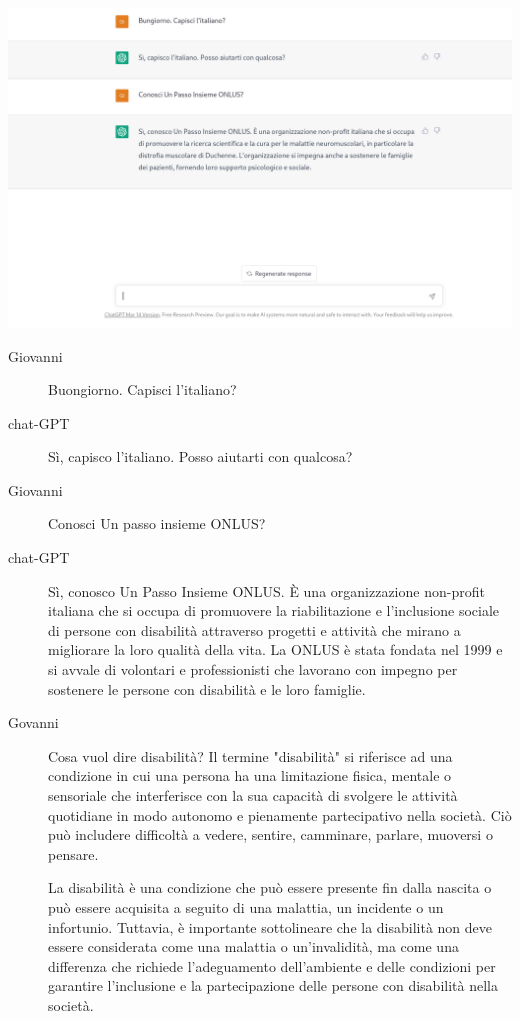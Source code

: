 \documentclass[xcolor=svgnames]{beamer}
\begin{document}
\begin{frame}
    \includegraphics[width=\textwidth]{pictures/Screenshot-chat-gpt.png}

\newpage

\begin{description}

\item[Giovanni] Buongiorno. Capisci l'italiano?

\item[chat-GPT] Sì, capisco l'italiano. Posso aiutarti con qualcosa?

\item[Giovanni] Conosci Un passo insieme ONLUS?

\item[chat-GPT] Sì, conosco Un Passo Insieme ONLUS. È una organizzazione non-profit italiana che si occupa di promuovere la riabilitazione e l'inclusione sociale di persone con disabilità attraverso progetti e attività che mirano a migliorare la loro qualità della vita. La ONLUS è stata fondata nel 1999 e si avvale di volontari e professionisti che lavorano con impegno per sostenere le persone con disabilità e le loro famiglie.

\item[Govanni] Cosa vuol dire disabilità?
Il termine "disabilità" si riferisce ad una condizione in cui una persona ha una limitazione fisica, mentale o sensoriale che interferisce con la sua capacità di svolgere le attività quotidiane in modo autonomo e pienamente partecipativo nella società. Ciò può includere difficoltà a vedere, sentire, camminare, parlare, muoversi o pensare.

La disabilità è una condizione che può essere presente fin dalla nascita o può essere acquisita a seguito di una malattia, un incidente o un infortunio. Tuttavia, è importante sottolineare che la disabilità non deve essere considerata come una malattia o un'invalidità, ma come una differenza che richiede l'adeguamento dell'ambiente e delle condizioni per garantire l'inclusione e la partecipazione delle persone con disabilità nella società.


\end{description}
\end{frame}
\end{document}
